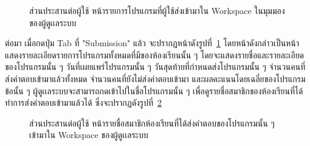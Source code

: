 \documentclass[12pt,one side,openright,a4paper]{cpe-thesis-th}
\newcommand{\thaijustify}[1]{%
  \par\hspace{30pt}\justifying
  #1
}
\begin{document}
    \pagebreak
    \hypertarget{ui-assign7}{
        \begin{figure}[H]
        \centering
            \caption[ส่วนประสานต่อผู้ใช้ หน้ารายการโปรแกรมที่ผู้ใช้ส่งเข้ามาใน Workspace ในมุมมองของผู้ดูเเลระบบ]{ส่วนประสานต่อผู้ใช้ หน้ารายการโปรแกรมที่ผู้ใช้ส่งเข้ามาใน Workspace ในมุมมองของผู้ดูเเลระบบ}
            \label{fig:ui-assign7}
        \end{figure}
    }
    \thaijustify{
        ต่อมา เมื่อกดปุ่ม Tab ที่ "Submission" แล้ว จะปรากฏหน้าดังรูปที่~\ref{fig:ui-assign7} โดยหน้าดังกล่าวเป็นหน้าแสดงรายละเอียดรายการโปรแกรมทั้งหมดที่มีของห้องเรียนนั้น ๆ โดยจะแสดงรายชื่อและรายละเอียดของโปรแกรมนั้น ๆ วันที่เผยแพร่โปรแกรมนั้น ๆ วันสุดท้ายที่กำหนดส่งโปรแกรมนั้น ๆ จำนวนคนที่ส่งคำตอบเข้ามาแล้วทั้งหมด จำนวนคนที่ยังไม่ส่งคำตอบเข้ามา และผลคะแนนโดยเฉลี่ยของโปรแกรมข้อนั้น ๆ ผู้ดูเเลระบบจะสามารถกดเข้าไปในชื่อโปรแกรมนั้น ๆ เพื่อดูรายชื่อสมาชิกของห้องเรียนที่ได้ทำการส่งคำตอบเข้ามาแล้วได้ ซึ่งจะปรากฏดังรูปที่~\ref{fig:ui-assign8}
    }
    \hypertarget{ui-assign8}{
        \begin{figure}[H]
        \centering
            \caption[ส่วนประสานต่อผู้ใช้ หน้ารายชื่อสมาชิกห้องเรียนที่ได้ส่งคำตอบของโปรแกรมนั้น ๆ ของผู้ดูเเลระบบ]{ส่วนประสานต่อผู้ใช้ หน้ารายชื่อสมาชิกห้องเรียนที่ได้ส่งคำตอบของโปรแกรมนั้น ๆ เข้ามาใน Workspace ของผู้ดูเเลระบบ}
            \label{fig:ui-assign8}
        \end{figure}
    }
\end{document}
